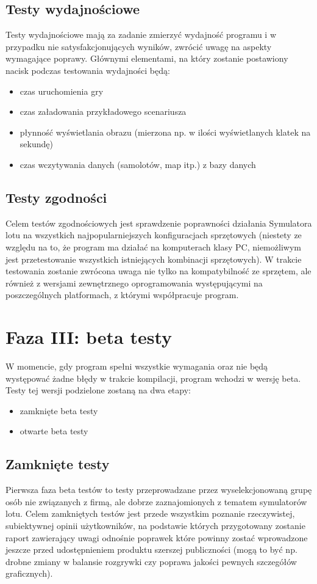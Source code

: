\documentclass{mwrep}
\begin{document}
\section{Testy wydajnościowe}
Testy wydajnościowe mają za zadanie zmierzyć wydajność programu i w przypadku nie satysfakcjonujących wyników, zwrócić uwagę na aspekty wymagające poprawy. Głównymi elementami, na który zostanie postawiony nacisk podczas testowania wydajności będą:
\begin{itemize}
\item czas uruchomienia gry
\item czas załadowania przykładowego scenariusza
\item płynność wyświetlania obrazu (mierzona np. w ilości wyświetlanych klatek na sekundę)
\item czas wczytywania danych (samolotów, map itp.) z bazy danych
\end{itemize}

\section{Testy zgodności}
Celem testów zgodnościowych jest sprawdzenie poprawności działania Symulatora lotu na wszystkich najpopularniejszych konfiguracjach sprzętowych (niestety ze względu na to, że program ma działać na komputerach klasy PC, niemożliwym jest przetestowanie wszystkich istniejących kombinacji sprzętowych). W trakcie testowania zostanie zwrócona uwaga nie tylko na kompatybilność ze sprzętem, ale również z wersjami zewnętrznego oprogramowania występującymi na poszczególnych platformach, z którymi współpracuje program.

\chapter{Faza III: beta testy}
W momencie, gdy program spełni wszystkie wymagania oraz nie będą występować żadne błędy w trakcie kompilacji, program wchodzi w wersję beta. Testy tej wersji podzielone zostaną na dwa etapy:
\begin{itemize}
\item zamknięte beta testy
\item otwarte beta testy
\end{itemize}

\section{Zamknięte testy}
Pierwsza faza beta testów to testy przeprowadzane przez wyselekcjonowaną grupę osób nie związanych z firmą, ale dobrze zaznajomionych z tematem symulatorów lotu. Celem zamkniętych testów jest przede wszystkim poznanie rzeczywistej, subiektywnej opinii użytkowników, na podstawie których przygotowany zostanie raport zawierający uwagi odnośnie poprawek które powinny zostać wprowadzone jeszcze przed udostępnieniem produktu szerszej publiczności (mogą to być np. drobne zmiany w balansie rozgrywki czy poprawa jakości pewnych szczegółów graficznych).
\end{document}
